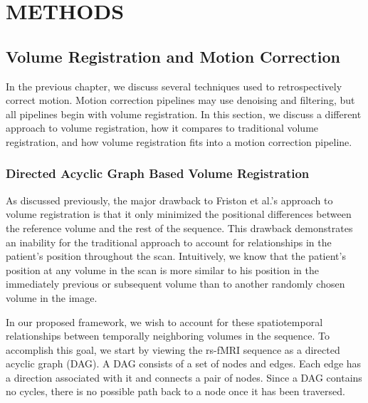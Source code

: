 \chapter{METHODS}
\label{ch4:methods}

\section{Volume Registration and Motion Correction}

In the previous chapter, we discuss several techniques used to retrospectively correct motion. Motion correction pipelines may use denoising and filtering, but all pipelines begin with volume registration. In this section, we discuss a different approach to volume registration, how it compares to traditional volume registration, and how volume registration fits into a motion correction pipeline. 


\subsection{Directed Acyclic Graph Based Volume Registration}

As discussed previously, the major drawback to Friston et al.'s approach to volume registration is that it only minimized the positional differences between the reference volume and the rest of the sequence. This drawback demonstrates an inability for the traditional approach to account for relationships in the patient's position throughout the scan. Intuitively, we know that the patient's position at any volume in the scan is more similar to his position in the immediately previous or subsequent volume than to another randomly chosen volume in the image.

In our proposed framework, we wish to account for these spatiotemporal relationships between temporally neighboring volumes in the sequence. To accomplish this goal, we start by viewing the rs-fMRI sequence as a directed acyclic graph (DAG). A DAG consists of a set of nodes and edges. Each edge has a direction associated with it and connects a pair of nodes. Since a DAG contains no cycles, there is no possible path back to a node once it has been traversed. 

